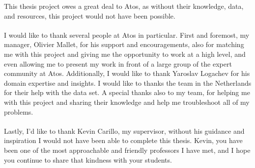 \begin{acknowledgments}
This thesis project owes a great deal to Atos, as without their knowledge, data, and resources, this project would not have been possible. \\
\\
I would like to thank several people at Atos in particular. First and foremost, my manager, Olivier Mallet, for his support and encouragements, also for matching me with this project and giving me the opportunity to work at a high level, and even allowing me to present my work in front of a large group of the expert community at Atos. Additionally, I would like to thank Yaroslav Logachev for his domain expertise and insights. I would like to thanks the team in the Netherlands for their help with the data set. A special thanks also to my team, for helping me with this project and sharing their knowledge and help me troubleshoot all of my problems.\\
\\
Lastly, I’d like to thank Kevin Carillo, my supervisor, without his guidance and inspiration I would not have been able to complete this thesis. Kevin, you have been one of the most approachable and friendly professors I have met, and I hope you continue to share that kindness with your students.
\end{acknowledgments}